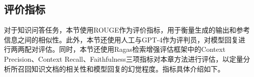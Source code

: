 
\subsection{评价指标}

对于知识问答任务，本节使用ROUGE作为评价指标，用于衡量生成的输出和参考信息之间的相似性。此外，本节还使用人工与GPT-4作为评判员，对模型回复进行两两配对评估。同时，本节还使用Ragas\cite{DBLP:conf/eacl/ESJAS24}检索增强评估框架中的Context Precision、Context Recall、Faithfulness三项指标对本章方法进行评估，以定量分析所召回知识文档的相关性和模型回复的幻觉程度。指标具体介绍如下。

